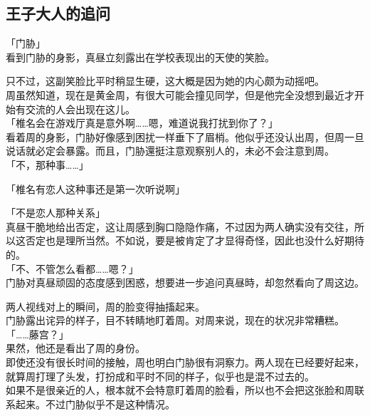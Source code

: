 \subsection{王子大人的追问}

「门胁」\\

看到门胁的身影，真昼立刻露出在学校表现出的天使的笑脸。

只不过，这副笑脸比平时稍显生硬，这大概是因为她的内心颇为动摇吧。\\

周虽然知道，现在是黄金周，有很大可能会撞见同学，但是他完全没想到最近才开始有交流的人会出现在这儿。\\

「椎名会在游戏厅真是意外啊……嗯，难道说我打扰到你了？」\\

看着周的身影，门胁好像感到困扰一样垂下了眉梢。他似乎还没认出周，但周一旦说话就必定会暴露。而且，门胁還挺注意观察别人的，未必不会注意到周。\\

「不，那种事……」

「椎名有恋人这种事还是第一次听说啊」

「不是恋人那种关系」\\

真昼干脆地给出否定，这让周感到胸口隐隐作痛，不过因为两人确实没有交往，所以这否定也是理所当然。不如说，要是被肯定了才显得奇怪，因此也没什么好期待的。\\

「不、不管怎么看都……嗯？」\\

门胁对真昼顽固的态度感到困惑，想要进一步追问真昼時，却忽然看向了周这边。

两人视线对上的瞬间，周的脸变得抽搐起来。\\

门胁露出诧异的样子，目不转睛地盯着周。对周来说，现在的状况非常糟糕。\\

「……藤宫？」\\

果然，他还是看出了周的身份。\\

即使还没有很长时间的接触，周也明白门胁很有洞察力。两人现在已经要好起来，就算周打理了头发，打扮成和平时不同的样子，似乎也是混不过去的。\\

如果不是很亲近的人，根本就不会特意盯着周的脸看，所以也不会把这张脸和周联系起来。不过门胁似乎不是这种情况。\\%

